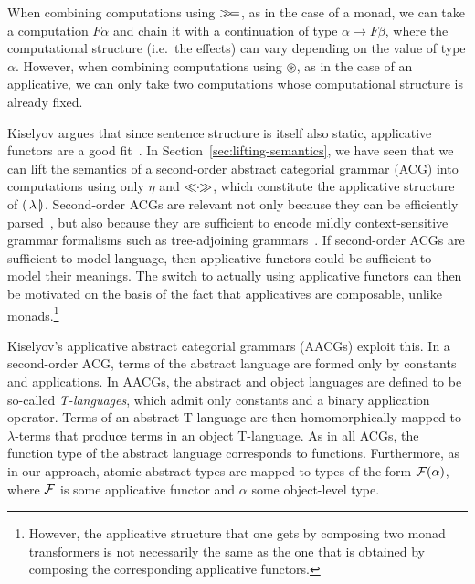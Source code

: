 \begin{itemize}
  When combining computations using $\mathbin{\gg\!=}$, as in the case of a monad,
  we can take a computation $F \alpha$ and chain it with a continuation of
  type $\alpha \to F \beta$, where the computational structure (i.e.\ the
  effects) can vary depending on the value of type $\alpha$. However, when
  combining computations using $\circledast$, as in the case of an
  applicative, we can only take two computations whose computational
  structure is already fixed. 

  Kiselyov argues that since sentence structure is itself also static,
  applicative functors are a good fit~\cite{kiselyov2015applicative}. In
  Section~\ref{sec:lifting-semantics}, we have seen that we can lift the
  semantics of a second-order abstract categorial grammar (ACG) into
  computations using only $\eta$ and $\mathbin{\ll\!\!\cdot\!\!\gg}$, which constitute the
  applicative structure of ${\llparenthesis \, \lambda \, \rrparenthesis}$. Second-order ACGs are relevant not only
  because they can be efficiently parsed~\cite{kanazawa2007parsing}, but
  also because they are sufficient to encode mildly context-sensitive
  grammar formalisms such as tree-adjoining grammars~\cite{degroote02}. If
  second-order ACGs are sufficient to model language, then applicative
  functors could be sufficient to model their meanings. The switch to
  actually using applicative functors can then be motivated on the basis of
  the fact that applicatives are composable, unlike
  monads.\footnote{However, the applicative structure that one gets by
    composing two monad transformers is not necessarily the same as the one
    that is obtained by composing the corresponding applicative functors.}

  Kiselyov's applicative abstract categorial grammars (AACGs) exploit
  this. In a second-order ACG, terms of the abstract language are formed
  only by constants and applications. In AACGs, the abstract and object
  languages are defined to be so-called \emph{T-languages}, which admit
  only constants and a binary application operator. Terms of an abstract
  T-language are then homomorphically mapped to $\lambda$-terms that
  produce terms in an object T-language. As in all ACGs, the function type
  of the abstract language corresponds to functions. Furthermore, as in our
  approach, atomic abstract types are mapped to types of the form
  $\mathcal{F}(\alpha)$, where $\mathcal{F}$ is some applicative functor and $\alpha$ some
  object-level type.


\end{itemize}
